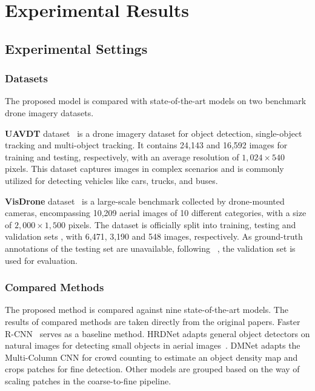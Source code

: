 \documentclass[letterpaper]{article} %
\def \ie {\emph{i.e.}}
\newcommand\qz[1]{\textcolor{blue}{\{QZ: #1\}}}
\begin{document}
\section{Experimental Results}
\label{sec: experiments}

\subsection{Experimental Settings}
\label{ssec: experimental settings}

\subsubsection{Datasets} 
\label{sssec:dataset}
The proposed model is compared with state-of-the-art models on two benchmark drone imagery datasets. %

\noindent \textbf{UAVDT} dataset~\cite{Du_2018_UAVDT} is a drone imagery dataset %
for object detection, single-object tracking and multi-object tracking. It contains 24,143 and 16,592 images for training and testing, respectively, with an average resolution of $1,024\times540$ pixels. %
This dataset captures images in complex scenarios and is commonly utilized for detecting vehicles like cars, trucks, and buses. 

\noindent \textbf{VisDrone} dataset~\cite{Zhu_2022_VisDrone} is a large-scale benchmark collected by drone-mounted cameras, %
encompassing 10,209 aerial images of 10 different categories, with a size of $2,000\times1,500$ pixels. The dataset is officially split into training, testing and validation sets%
, with 6,471, 3,190 and 548 images, %
respectively. As ground-truth annotations of the testing set are unavailable, following %
~\cite{Liu_2021_HRDNet, Ge_2022_ZoomAndReasoning}, the validation set is used for evaluation. 

\subsubsection{Compared Methods}
The proposed method is compared against nine state-of-the-art models. The results of compared methods are taken directly from the original papers. 
Faster R-CNN~\cite{Ren_2017_Faster} serves as a baseline method. 
HRDNet adapts general object detectors on natural images for detecting small objects in aerial images~\cite{Liu_2021_HRDNet}. DMNet \cite{Li_2020_Density_Workshops} adapts the Multi-Column CNN for crowd counting to estimate an object density map and crops patches for fine detection. Other models are grouped based on the way of scaling patches in the coarse-to-fine pipeline. 
\end{document}
